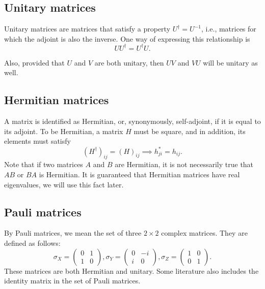 \subsection{Unitary matrices}
Unitary matrices are matrices that satisfy a property $U^\dag = U^{-1}$, i.e., matrices for which the adjoint is also the inverse. One way of expressing this relationship is 
$$U U^{\dag} = U^{\dag} U.$$

Also, provided that $U$ and $V$ are both unitary, then $UV$ and $VU$ will be unitary as well.

\subsection{Hermitian matrices}
A matrix is identified as Hermitian, or, synonymously, self-adjoint, if it is equal to its adjoint. To be Hermitian, a matrix $H$ must be square, and in addition, its elements must satisfy $$(H^{\dag})_{ij} = (H)_{ij} \implies h^{*}_{ji} = h_{ij}.$$ Note that if two matrices $A$ and $B$ are Hermitian, it is not necessarily true that $AB$ or $BA$ is Hermitian. It is guaranteed that Hermitian matrices have real eigenvalues, we will use this fact later.

\subsection{Pauli matrices}\label{sec:pauli-matrices}
By Pauli matrices, we mean the set of three $2 \times 2$ complex matrices. They are defined as follows:
$$\sigma_X = \begin{pmatrix}
    0 & 1 \\
    1 & 0
\end{pmatrix}, \sigma_Y = \begin{pmatrix}
    0 & -i \\
    i & 0
\end{pmatrix}, \sigma_Z = \begin{pmatrix}
    1 & 0 \\
    0 & 1
\end{pmatrix}\text{.}$$ 
These matrices are both Hermitian and unitary. Some literature also includes the identity matrix in the set of Pauli matrices. 

